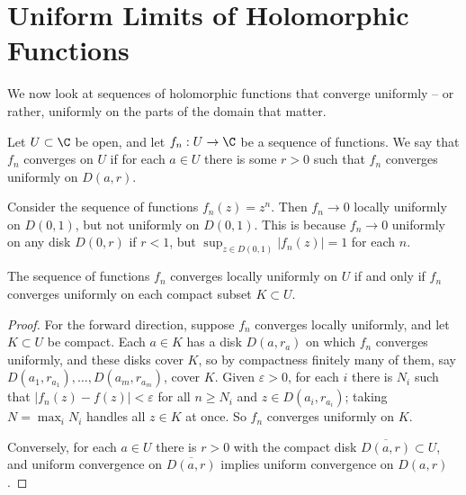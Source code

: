 \section{Uniform Limits of Holomorphic Functions}

We now look at sequences of holomorphic functions that converge uniformly -- or rather, uniformly on the parts of the domain that matter.

\begin{definition}
    Let $U \subset \C$ be open, and let $f_n : U \rightarrow \C$ be a sequence
    of functions. We say that $f_n$ converges  on $U$ if for each $a \in U$ there is some $r > 0$ such that $f_n$ converges uniformly on $D(a, r)$.
\end{definition}

\begin{example}
    Consider the sequence of functions $f_n(z) = z^n$. Then $f_n \rightarrow 0$ locally uniformly on $D(0, 1)$, but not uniformly on $D(0, 1)$. This is because $f_n \rightarrow 0$ uniformly on any disk $D(0, r)$ if $r < 1$, but $\sup_{z \in D(0, 1)} |f_n(z)| = 1$ for each $n$.
\end{example}

\begin{proposition}
    The sequence of functions $f_n$ converges locally uniformly on $U$ if and only if $f_n$ converges uniformly on each compact subset $K \subset U$.
\end{proposition}
\begin{proof}
    For the forward direction, suppose $f_n$ converges locally uniformly, and let $K \subset U$ be compact. Each $a \in K$ has a disk $D(a, r_a)$ on which $f_n$ converges uniformly, and these disks cover $K$, so by compactness finitely many of them, say $D(a_1, r_{a_1}), \dots, D(a_m, r_{a_m})$, cover $K$. Given $\varepsilon > 0$, for each $i$ there is $N_i$ such that $|f_n(z) - f(z)| < \varepsilon$ for all $n \geq N_i$ and $z \in D(a_i, r_{a_i})$; taking $N = \max_i N_i$ handles all $z \in K$ at once. So $f_n$ converges uniformly on $K$.

    Conversely, for each $a \in U$ there is $r > 0$ with the compact disk $\overline{D(a, r)} \subset U$, and uniform convergence on $\overline{D(a, r)}$ implies uniform convergence on $D(a, r)$.
\end{proof}

